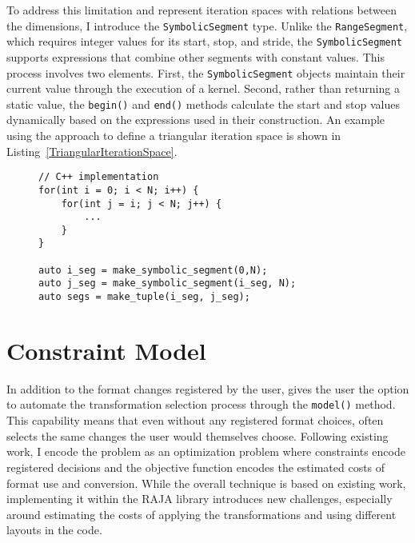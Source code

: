 To address this limitation and represent iteration spaces with relations between the dimensions, I introduce the \verb.SymbolicSegment. type. 
Unlike the \verb.RangeSegment., which requires integer values for its start, stop, and stride, the \verb.SymbolicSegment. supports expressions that combine other segments with constant values. 
This process involves two elements.
First, the \verb.SymbolicSegment. objects maintain their current value through the execution of a kernel. 
Second, rather than returning a static value, the \verb.begin(). and \verb.end(). methods calculate the start and stop values dynamically based on the expressions used in their construction. 
An example using the approach to define a triangular iteration space is shown in Listing~\ref{TriangularIterationSpace}.

\begin{figure}
	\begin{lstlisting}[caption={An example of a loop with a triangular iteration space, expressed in C++ and using SymbolicSegments.},label={TriangularIterationSpace}]
// C++ implementation
for(int i = 0; i < N; i++) {
	for(int j = i; j < N; j++) {
		...
	}
}

auto i_seg = make_symbolic_segment(0,N);
auto j_seg = make_symbolic_segment(i_seg, N);
auto segs = make_tuple(i_seg, j_seg);

	\end{lstlisting}

\end{figure}



\section{Constraint Model}

In addition to the format changes registered by the user, \FormatDecisions{} gives the user the option to automate the transformation selection process through the \verb.model(). method.
This capability means that even without any registered format choices, \FormatDecisions{} often selects the same changes the user would themselves choose.
Following existing work, I encode the problem as an optimization problem where constraints encode registered decisions and the objective function encodes the estimated costs of format use and conversion.
While the overall technique is based on existing work, implementing it within the RAJA library introduces new challenges, especially around estimating the costs of applying the transformations and using different layouts in the code.

